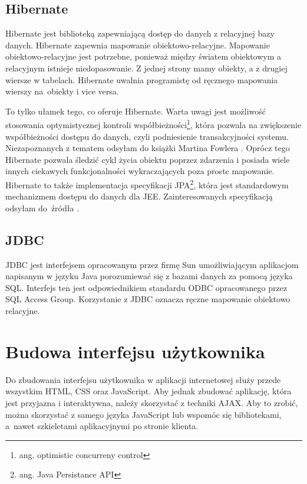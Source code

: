 \documentclass[a4paper,onecolumn,oneside,11pt,wide,floatssmall]{mwrep}
\theoremstyle{definition}
\theoremstyle{plain}%
\theoremstyle{remark}
\begin{document}
\subsection{Hibernate}
Hibernate \cite{hibernateHome} jest biblioteką zapewniającą dostęp do danych z relacyjnej bazy danych. Hibernate zapewnia mapowanie obiektowo-relacyjne. Mapowanie obiektowo-relacyjne jest potrzebne, ponieważ między światem obiektowym a relacyjnym istnieje niedopasowanie. Z jednej strony mamy obiekty, a z drugiej wiersze w tabelach. Hibernate uwalnia programistę od ręcznego mapowania wierszy \mbox{na obiekty} i vice versa. 

To tylko ułamek tego, co oferuje Hibernate. Warta uwagi jest możliwość stosowania optymistycznej kontroli współbieżności\footnote{ang. optimistic concurreny control}, która pozwala na zwiększenie współbieżności dostępu do danych, czyli podniesienie transakcyjności systemu. Niezapoznanych z tematem odsyłam do książki Martina Fowlera \cite{fowler2003patterns}.
 Oprócz tego Hibernate pozwala śledzić cykl życia obiektu poprzez zdarzenia i posiada wiele innych ciekawych funkcjonalności wykraczających poza proste mapowanie.
Hibernate to także implementacja specyfikacji JPA\footnote{ang. Java Persistance API}, która jest standardowym mechanizmem dostępu do danych dla JEE. Zainteresowanych specyfikacją odsyłam \mbox{do źródła} \cite{jpa2.0}.

\subsection{JDBC}
JDBC jest interfejsem opracowanym przez firmę Sun umożliwiającym aplikacjom napisanym w języku Java porozumiewać się z bazami danych za pomocą języka SQL. Interfejs ten jest odpowiednikiem standardu ODBC opracowanego przez SQL Access Group. Korzystanie z JDBC oznacza ręczne mapowanie obiektowo relacyjne.

\section{Budowa interfejsu użytkownika}
Do zbudowania interfejsu użytkownika w aplikacji internetowej służy przede wszystkim HTML, CSS oraz JavaScript. Aby jednak zbudować aplikację, która jest przyjazna i interaktywna, należy skorzystać z techniki AJAX. Aby to zrobić, można skorzystać z samego języka JavaScript lub wspomóc się bibliotekami, \mbox{a nawet} szkieletami aplikacyjnymi po stronie klienta.
\end{document}
